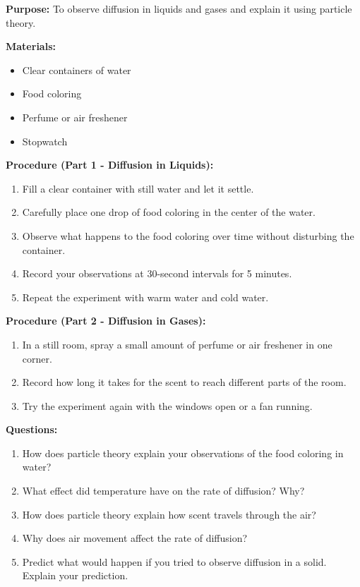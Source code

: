 \documentclass[justified,notoc]{tufte-book}
\newenvironment{investigation}[1]{%
    \begin{tcolorbox}[colback=info!10,colframe=info,title=\textbf{Investigation: #1}]
}{%
    \end{tcolorbox}
}
\begin{document}
\begin{investigation}{Observing Diffusion}
\textbf{Purpose:} To observe diffusion in liquids and gases and explain it using particle theory.

\textbf{Materials:}
\begin{itemize}
    \item Clear containers of water
    \item Food coloring
    \item Perfume or air freshener
    \item Stopwatch
\end{itemize}

\textbf{Procedure (Part 1 - Diffusion in Liquids):}
\begin{enumerate}
    \item Fill a clear container with still water and let it settle.
    \item Carefully place one drop of food coloring in the center of the water.
    \item Observe what happens to the food coloring over time without disturbing the container.
    \item Record your observations at 30-second intervals for 5 minutes.
    \item Repeat the experiment with warm water and cold water.
\end{enumerate}

\textbf{Procedure (Part 2 - Diffusion in Gases):}
\begin{enumerate}
    \item In a still room, spray a small amount of perfume or air freshener in one corner.
    \item Record how long it takes for the scent to reach different parts of the room.
    \item Try the experiment again with the windows open or a fan running.
\end{enumerate}

\textbf{Questions:}
\begin{enumerate}
    \item How does particle theory explain your observations of the food coloring in water?
    \item What effect did temperature have on the rate of diffusion? Why?
    \item How does particle theory explain how scent travels through the air?
    \item Why does air movement affect the rate of diffusion?
    \item Predict what would happen if you tried to observe diffusion in a solid. Explain your prediction.
\end{enumerate}
\end{investigation}
\end{document}
